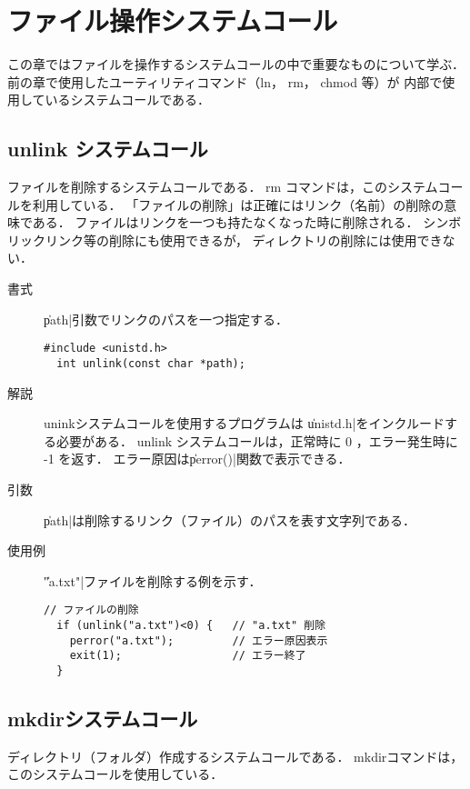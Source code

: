 \chapter{ファイル操作システムコール}

この章ではファイルを操作するシステムコールの中で重要なものについて学ぶ．
前の章で使用したユーティリティコマンド（ln， rm， chmod 等）が
内部で使用しているシステムコールである．

\section{unlink システムコール}
ファイルを削除するシステムコールである．
rm コマンドは，このシステムコールを利用している．
「ファイルの削除」は正確にはリンク（名前）の削除の意味である．
ファイルはリンクを一つも持たなくなった時に削除される．
シンボリックリンク等の削除にも使用できるが，
ディレクトリの削除には使用できない．

\begin{description}
\item[書式] \|path|引数でリンクのパスを一つ指定する．
\begin{lstlisting}[numbers=none]
  #include <unistd.h>
  int unlink(const char *path);
\end{lstlisting}

\item[解説] uninkシステムコールを使用するプログラムは
\|unistd.h|をインクルードする必要がある．
unlink システムコールは，正常時に 0 ，エラー発生時に -1 を返す．
エラー原因は\|perror()|関数で表示できる．

\item[引数] \|path|は削除するリンク（ファイル）のパスを表す文字列である．

\item[使用例] \|"a.txt"|ファイルを削除する例を示す．
\begin{lstlisting}[numbers=none]
  // ファイルの削除
  if (unlink("a.txt")<0) {   // "a.txt" 削除
    perror("a.txt");         // エラー原因表示
    exit(1);                 // エラー終了
  }
\end{lstlisting}
\end{description}

\section{mkdirシステムコール}
ディレクトリ（フォルダ）作成するシステムコールである．
mkdirコマンドは，このシステムコールを使用している．

